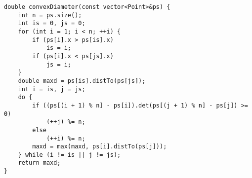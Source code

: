 \begin{lstlisting} 
double convexDiameter(const vector<Point>&ps) {
	int n = ps.size();
	int is = 0, js = 0;
	for (int i = 1; i < n; ++i) {
		if (ps[i].x > ps[is].x)
			is = i;
		if (ps[i].x < ps[js].x)
			js = i;
	}
	double maxd = ps[is].distTo(ps[js]);
	int i = is, j = js;
	do {
		if ((ps[(i + 1) % n] - ps[i]).det(ps[(j + 1) % n] - ps[j]) >= 0)
			(++j) %= n;
		else
			(++i) %= n;
		maxd = max(maxd, ps[i].distTo(ps[j]));
	} while (i != is || j != js);
	return maxd;
}
\end{lstlisting} 
